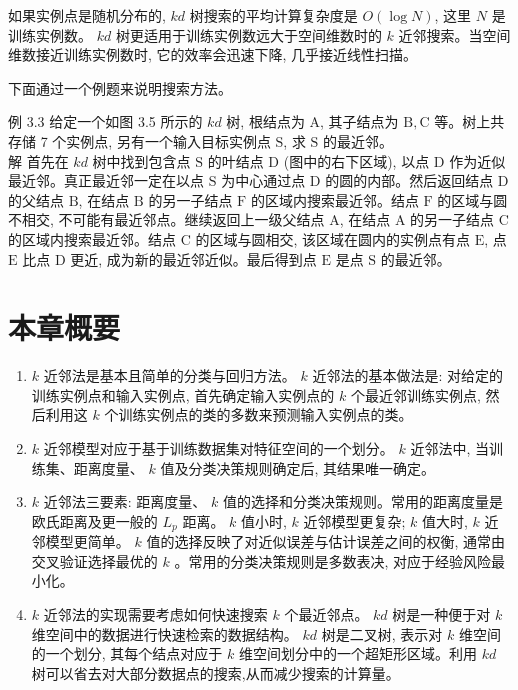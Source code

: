 \documentclass[10pt]{article}
\begin{document}
如果实例点是随机分布的, $k d$ 树搜索的平均计算复杂度是 $O(\log N)$, 这里 $N$ 是训练实例数。 $k d$ 树更适用于训练实例数远大于空间维数时的 $k$ 近邻搜索。当空间维数接近训练实例数时, 它的效率会迅速下降, 几乎接近线性扫描。

下面通过一个例题来说明搜索方法。

例 3.3 给定一个如图 3.5 所示的 $k d$ 树, 根结点为 $\mathrm{A}$, 其子结点为 $\mathrm{B}, \mathrm{C}$ 等。树上共存储 7 个实例点, 另有一个输入目标实例点 $\mathrm{S}$, 求 $\mathrm{S}$ 的最近邻。\\
解 首先在 $k d$ 树中找到包含点 $\mathrm{S}$ 的叶结点 $\mathrm{D}$ (图中的右下区域), 以点 $\mathrm{D}$ 作为近似最近邻。真正最近邻一定在以点 $\mathrm{S}$ 为中心通过点 $\mathrm{D}$ 的圆的内部。然后返回结点 $\mathrm{D}$ 的父结点 $\mathrm{B}$, 在结点 $\mathrm{B}$ 的另一子结点 $\mathrm{F}$ 的区域内搜索最近邻。结点 $\mathrm{F}$ 的区域与圆不相交, 不可能有最近邻点。继续返回上一级父结点 $\mathrm{A}$, 在结点 $\mathrm{A}$ 的另一子结点 $\mathrm{C}$ 的区域内搜索最近邻。结点 $\mathrm{C}$ 的区域与圆相交, 该区域在圆内的实例点有点 $\mathrm{E}$, 点 $\mathrm{E}$ 比点 $\mathrm{D}$ 更近, 成为新的最近邻近似。最后得到点 $\mathrm{E}$ 是点 $\mathrm{S}$ 的最近邻。

\section*{本章概要}
\begin{enumerate}
  \item $k$ 近邻法是基本且简单的分类与回归方法。 $k$ 近邻法的基本做法是: 对给定的训练实例点和输入实例点, 首先确定输入实例点的 $k$ 个最近邻训练实例点, 然后利用这 $k$ 个训练实例点的类的多数来预测输入实例点的类。
  \item $k$ 近邻模型对应于基于训练数据集对特征空间的一个划分。 $k$ 近邻法中, 当训练集、距离度量、 $k$ 值及分类决策规则确定后, 其结果唯一确定。
  \item $k$ 近邻法三要素: 距离度量、 $k$ 值的选择和分类决策规则。常用的距离度量是欧氏距离及更一般的 $L_{p}$ 距离。 $k$ 值小时, $k$ 近邻模型更复杂; $k$ 值大时, $k$ 近邻模型更简单。 $k$ 值的选择反映了对近似误差与估计误差之间的权衡, 通常由交叉验证选择最优的 $k$ 。常用的分类决策规则是多数表决, 对应于经验风险最小化。
  \item $k$ 近邻法的实现需要考虑如何快速搜索 $k$ 个最近邻点。 $k d$ 树是一种便于对 $k$ 维空间中的数据进行快速检索的数据结构。 $k d$ 树是二叉树, 表示对 $k$ 维空间的一个划分, 其每个结点对应于 $k$ 维空间划分中的一个超矩形区域。利用 $k d$ 树可以省去对大部分数据点的搜索,从而减少搜索的计算量。
\end{enumerate}
\end{document}
